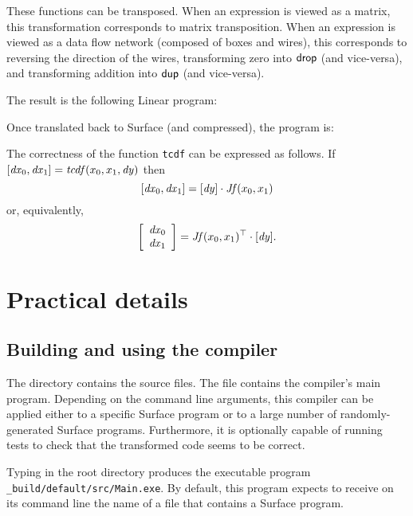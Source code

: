 \documentclass{article}
\begin{document}
These functions can be transposed. When an expression is viewed as a matrix,
this transformation corresponds to matrix transposition. When an expression is
viewed as a data flow network (composed of boxes and wires), this corresponds
to reversing the direction of the wires, transforming zero into
$\mathsf{drop}$ (and vice-versa), and transforming addition into
$\mathsf{dup}$ (and vice-versa).

The result is the following Linear program:

\begin{mdframed}[backgroundcolor=gray!10,linewidth=0pt]

\end{mdframed}

Once translated back to Surface (and compressed), the program is:

\begin{mdframed}[backgroundcolor=gray!10,linewidth=0pt]

\end{mdframed}

The correctness of the function \texttt{tcdf} can be expressed as follows.
If
\([\mathit{dx}_0, \mathit{dx}_1] = \mathit{tcdf}(x_0, x_1, \mathit{dy})\)
then
\[
  [\mathit{dx}_0, \mathit{dx}_1] =
  [ \mathit{dy} ] \cdot \mathit{Jf}(x_0, x_1)
\]
or, equivalently,
\[
  \left[\begin{array}{c}\mathit{dx}_0\\\mathit{dx}_1\end{array}\right] = \mathit{Jf}(x_0, x_1)^\top \cdot [ \mathit{dy} ].
\]


\section{Practical details}

\subsection{Building and using the compiler}
\label{sec:testing}

The directory  contains the source files. The file 
contains the compiler's main program. Depending on the command line arguments,
this compiler can be applied either to a specific Surface program or to a
large number of randomly-generated Surface programs. Furthermore, it is
optionally capable of running tests to check that the transformed code seems
to be correct.

Typing  in the root directory produces the executable program
\texttt{\_build/default/src/Main.exe}. By default, this program expects to
receive on its command line the name of a file that contains a Surface
program.
\end{document}
